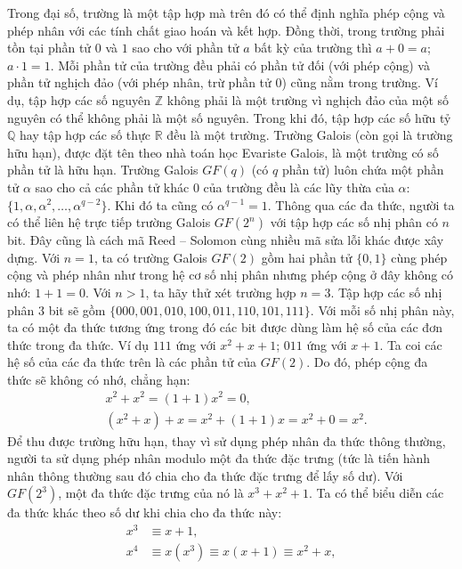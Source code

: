 \begin{multicols}{2}
	\vskip 0.05cm
	Trong đại số, trường là một tập hợp mà trên đó có thể định nghĩa phép cộng và phép nhân với các tính chất giao hoán và kết hợp. Đồng thời, trong trường phải tồn tại phần tử $0$ và $1$ sao cho với phần tử $a$ bất kỳ của trường thì $a+0=a$; $a\cdot1=1$. Mỗi phần tử của trường đều phải có phần tử đối (với phép cộng) và phần tử nghịch đảo (với phép nhân, trừ phần tử $0$) cũng nằm trong trường.
	\vskip 0.05cm
	Ví dụ, tập hợp các số nguyên $\mathbb{Z}$ không phải là một trường vì nghịch đảo của một số nguyên có thể không phải là một số nguyên. Trong khi đó, tập hợp các số hữu tỷ $\mathbb{Q}$ hay tập hợp các số thực $\mathbb{R}$ đều là một trường.
	\vskip 0.05cm
	Trường Galois (còn gọi là trường hữu hạn), được đặt tên theo nhà toán học Evariste Galois, là một trường có số phần tử là hữu hạn. Trường Galois $GF(q)$ (có $q$ phần tử) luôn chứa một phần tử $\alpha$ sao cho cả các phần tử khác $0$ của trường đều là các lũy thừa của $\alpha$: $\{1,\alpha,\alpha^2,\ldots,\alpha^{q-2}\}$. Khi đó ta cũng có $\alpha^{q-1}=1$.
	\vskip 0.05cm
	Thông qua các đa thức, người ta có thể liên hệ trực tiếp trường Galois $GF(2^n)$ với tập hợp các số nhị phân có $n$ bit. Đây cũng là cách mã Reed -- Solomon cùng nhiều mã sửa lỗi khác được xây dựng.
	\vskip 0.05cm
	Với $n=1$, ta có trường Galois $GF(2)$ gồm hai phần tử $\{0,1\}$ cùng phép cộng và phép nhân như trong hệ cơ số nhị phân nhưng phép cộng ở đây không có nhớ: $1+1=0$.
	\vskip 0.05cm
	Với $n > 1$, ta hãy thử xét trường hợp $n=3$. Tập hợp các số nhị phân $3$ bit sẽ gồm $\{000, 001, 010, 100, 011, 110, 101, 111\}$. Với mỗi số nhị phân này, ta có một đa thức tương ứng trong đó các bit được dùng làm hệ số của các đơn thức trong đa thức. Ví dụ $111$ ứng với $x^2+x+1$; $011$ ứng với $x+1$.
	\vskip 0.05cm
	Ta coi các hệ số của các đa thức trên là các phần tử của $GF(2)$. Do đó, phép cộng đa thức sẽ không có nhớ, chẳng hạn:
	\begin{align*}
		&x^2+x^2=(1+1) x^2=0,\\
		&(x^2+x)+x=x^2+(1+1)x=x^2+0=x^2.
	\end{align*}
	Để thu được trường hữu hạn, thay vì sử dụng phép nhân đa thức thông thường, người ta sử dụng phép nhân modulo một đa thức đặc trưng (tức là tiến hành nhân thông thường sau đó chia cho đa thức đặc trưng để lấy số dư). Với $GF(2^3)$, một đa thức đặc trưng của nó là $x^3+x^2+1$. Ta có thể biểu diễn các đa thức khác theo số dư khi chia cho đa thức này:
	\begin{align*}
		x^3&\equiv x+1,\\[-0.5ex]
		x^4&\equiv x(x^3 )\equiv x(x+1)\equiv x^2+x,\\[-0.5ex]

\end{align*}
\end{multicols}
